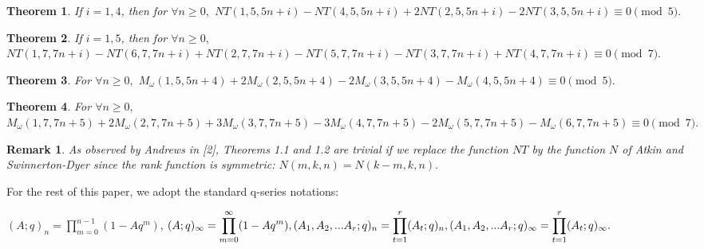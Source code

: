 \documentclass[10pt,reqno]{amsart}
\newtheorem{theorem}{Theorem}[section]
\newtheorem{remark}[]{Remark}
\begin{document}
\begin{theorem}
If $i=1,4$, then for $\forall n\ge 0,$ $NT(1,5,5n+i)-NT(4,5,5n+i)+2NT(2,5,5n+i)-2NT(3,5,5n+i) \equiv 0\pmod 5.$
\end{theorem}
\begin{theorem}
If $i=1,5$, then for $\forall n\ge 0,$ $NT(1,7,7n+i)-NT(6,7,7n+i)+NT(2,7,7n+i)-NT(5,7,7n+i)-NT(3,7,7n+i)+NT(4,7,7n+i)\equiv 0\pmod 7.$
\end{theorem}
\begin{theorem}
For $\forall n\ge 0,$ $M_{\omega}(1,5,5n+4)+2M_{\omega}(2,5,5n+4)-2M_{\omega}(3,5,5n+4)-M_{\omega}(4,5,5n+4)\equiv 0\pmod 5.$
\end{theorem}
\begin{theorem}
For $\forall n\ge 0,$ $M_{\omega}(1,7,7n+5)+2M_{\omega}(2,7,7n+5)+3M_{\omega}(3,7,7n+5)-3M_{\omega}(4,7,7n+5)-2M_{\omega}(5,7,7n+5)-M_{\omega}(6,7,7n+5)\equiv 0\pmod 7.$
\end{theorem}
\begin{remark} 
As observed by Andrews in [2], Theorems 1.1 and 1.2 are trivial if we replace the function $NT$ by the function $N$ of Atkin and Swinnerton-Dyer since the rank function is symmetric: $N(m,k,n)=N(k-m,k,n).$ 
\end{remark}
For the rest of this paper, we adopt the standard q-series notations:\\ 
\par $(A;q)_n=\displaystyle\prod_{m=0}^{n-1}(1-Aq^m)$,  $(A;q)_{\infty}=\displaystyle\prod_{m=0}^{\infty}(1-Aq^m),(A_1,A_2,...A_r;q)_n=\displaystyle\prod_{t=1}^{r}(A_t;q)_n,\\ \\(A_1,A_2,...A_r;q)_{\infty}=\displaystyle\prod_{t=1}^{r}(A_t;q)_{\infty}.$
\end{document}
